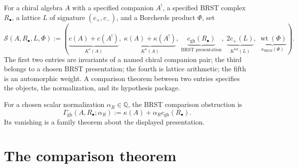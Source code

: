 \begin{definition}
\label{def:ghost-identity-structural-platonic}
For a chiral algebra $A$ with a specified companion $A^!$, a specified
BRST complex $R_\bullet$, a lattice $L$ of signature $(c_+,c_-)$,
and a Borcherds product $\Phi$, set
\begin{equation}
\label{eq:climax-equation-G3}
 \mathscr S(A,R_\bullet,L,\Phi)
 :=\left(
 \underbrace{c(A)+c(A^!)}_{K^c(A)},\;
 \underbrace{\kappa(A)+\kappa(A^!)}_{K^\kappa(A)},\;
 \underbrace{c_{\mathrm{gh}}(R_\bullet)}_{\text{BRST presentation}},\;
 \underbrace{2c_+(L)}_{K^{\mathrm{lat}}(L)},\;
 \underbrace{\operatorname{wt}(\Phi)}_{\kappa_{\mathrm{BKM}}(\Phi)}
 \right).
\end{equation}
The first two entries are invariants of a named chiral companion pair;
the third belongs to a chosen BRST presentation; the fourth is lattice
arithmetic; the fifth is an automorphic weight.  A comparison theorem
between two entries specifies the objects, the normalization, and its
hypothesis package.
\end{definition}

For a chosen scalar normalization $\alpha_R\in\mathbb Q$, the BRST
comparison obstruction is
\[
 \Gamma_{\mathrm{gh}}(A,R_\bullet;\alpha_R)
 :=\kappa(A)+\alpha_R c_{\mathrm{gh}}(R_\bullet).
\]
Its vanishing is a family theorem about the displayed presentation.

\section{The comparison theorem}
\label{sec:climax-platonic-climax-theorem}

